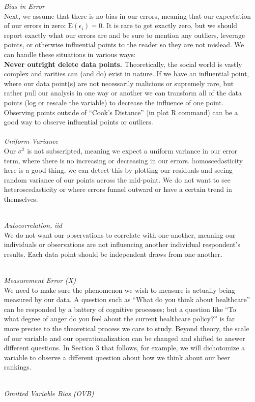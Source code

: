 \documentclass[12pt]{article}\usepackage[]{graphicx}\usepackage[]{color}
\begin{document}
\begin{flushleft}
\noindent \textit{Bias in Error}\\
Next, we assume that there is no bias in our errors, meaning that our expectation of our errors in zero: $\text{E}(\epsilon_i) = 0$. It is rare to get exactly zero, but we should report exactly what our errors are and be sure to mention any outliers, leverage points, or otherwise influential points to the reader so they are not mislead. We can handle these situations in various ways:\\
 \textbf{Never outright delete data points.} Theoretically, the social world is vastly complex and rarities can (and do) exist in nature. If we have an influential point, where our data point(s) are not necessarily malicious or supremely rare, but rather pull our analysis in one way or another we can transform all of the data points (log or rescale the variable) to decrease the influence of one point. Observing points outside of ``Cook's Distance'' (in plot R command) can be a good way to observe influential points or outliers. \\
\hfill \\

\noindent \textit{Uniform Variance}\\
Our $\sigma^2$ is not subscripted, meaning we expect a uniform variance in our error term, where there is no increasing or decreasing in our errors. homoscedasticity here is a good thing, we can detect this by plotting our residuals and seeing random variance of our points across the mid-point. We do not want to see heteroscedasticity or where errors funnel outward or have a certain trend in themselves.

\hfill \\
\noindent \textit{Autocorrelation, iid}\\
We do not want our observations to correlate with one-another, meaning our individuals or observations are not influencing another individual respondent's results. Each data point should be independent draws from one another.

\hfill \\
\noindent \textit{Measurement Error (X)}\\
We need to make sure the phenomenon we wish to measure is actually being measured by our data. A question such as ``What do you think about healthcare'' can be responded by a battery of cognitive processes; but a question like ``To what degree of anger do you feel about the current healthcare policy?'' is far more precise to the theoretical process we care to study. Beyond theory, the scale of our variable and our operationalization can be changed and shifted to answer different questions. In Section 3 that follows, for example, we will dichotomize a variable to observe a different question about how we think about our beer rankings.

\clearpage
\hfill \\
\noindent \textit{Omitted Variable Bias (OVB)}
\end{flushleft}
\end{document}

